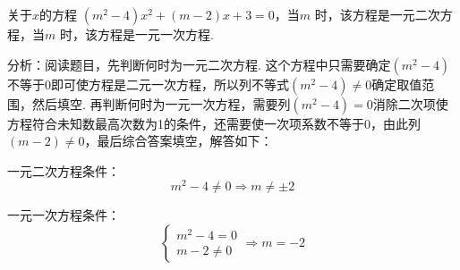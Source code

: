 \documentclass[lang=cn, 10pt, titlestyle=hang, oneside]{elegantbook}
\begin{document}
\begin{example}
关于$x$的方程 $(m^2 - 4)x^2 + (m - 2)x + 3 = 0$，当$m$ \underline{\hspace{3.5em}} 时，该方程是一元二次方程，当$m$ \underline{\hspace{3.5em}} 时，该方程是一元一次方程.
\end{example}
\par
\begin{solution}
    分析：阅读题目，先判断何时为一元二次方程. 这个方程中只需要确定$(m^2 - 4)$不等于0即可使方程是二元一次方程，所以列不等式$(m^2 - 4)\ne0$确定取值范围，然后填空. 再判断何时为一元一次方程，需要列$(m^2 - 4)=0$消除二次项使方程符合未知数最高次数为1的条件，还需要使一次项系数不等于0，由此列$(m-2)\ne 0$，最后综合答案填空，解答如下：
    
    一元二次方程条件：
    \[
    m^2 - 4 \neq 0 \Rightarrow m \neq \pm 2
    \]
    
    一元一次方程条件：
    \[
    \begin{cases}
    m^2 - 4 = 0 \\
    m - 2 \neq 0
    \end{cases}
    \Rightarrow m = -2
    \]
\end{solution}
\end{document}
